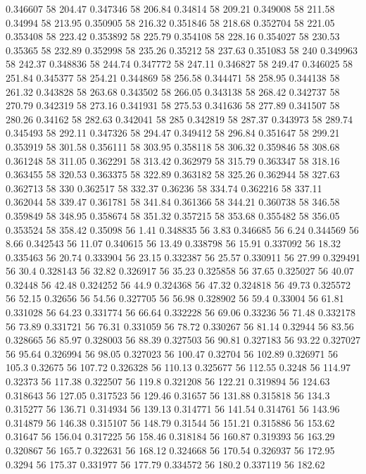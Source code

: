 0.346607 58 204.47
0.347346 58 206.84
0.34814 58 209.21
0.349008 58 211.58
0.34994 58 213.95
0.350905 58 216.32
0.351846 58 218.68
0.352704 58 221.05
0.353408 58 223.42
0.353892 58 225.79
0.354108 58 228.16
0.354027 58 230.53
0.35365 58 232.89
0.352998 58 235.26
0.35212 58 237.63
0.351083 58 240
0.349963 58 242.37
0.348836 58 244.74
0.347772 58 247.11
0.346827 58 249.47
0.346025 58 251.84
0.345377 58 254.21
0.344869 58 256.58
0.344471 58 258.95
0.344138 58 261.32
0.343828 58 263.68
0.343502 58 266.05
0.343138 58 268.42
0.342737 58 270.79
0.342319 58 273.16
0.341931 58 275.53
0.341636 58 277.89
0.341507 58 280.26
0.34162 58 282.63
0.342041 58 285
0.342819 58 287.37
0.343973 58 289.74
0.345493 58 292.11
0.347326 58 294.47
0.349412 58 296.84
0.351647 58 299.21
0.353919 58 301.58
0.356111 58 303.95
0.358118 58 306.32
0.359846 58 308.68
0.361248 58 311.05
0.362291 58 313.42
0.362979 58 315.79
0.363347 58 318.16
0.363455 58 320.53
0.363375 58 322.89
0.363182 58 325.26
0.362944 58 327.63
0.362713 58 330
0.362517 58 332.37
0.36236 58 334.74
0.362216 58 337.11
0.362044 58 339.47
0.361781 58 341.84
0.361366 58 344.21
0.360738 58 346.58
0.359849 58 348.95
0.358674 58 351.32
0.357215 58 353.68
0.355482 58 356.05
0.353524 58 358.42
0.35098 56 1.41
0.348835 56 3.83
0.346685 56 6.24
0.344569 56 8.66
0.342543 56 11.07
0.340615 56 13.49
0.338798 56 15.91
0.337092 56 18.32
0.335463 56 20.74
0.333904 56 23.15
0.332387 56 25.57
0.330911 56 27.99
0.329491 56 30.4
0.328143 56 32.82
0.326917 56 35.23
0.325858 56 37.65
0.325027 56 40.07
0.32448 56 42.48
0.324252 56 44.9
0.324368 56 47.32
0.324818 56 49.73
0.325572 56 52.15
0.32656 56 54.56
0.327705 56 56.98
0.328902 56 59.4
0.33004 56 61.81
0.331028 56 64.23
0.331774 56 66.64
0.332228 56 69.06
0.33236 56 71.48
0.332178 56 73.89
0.331721 56 76.31
0.331059 56 78.72
0.330267 56 81.14
0.32944 56 83.56
0.328665 56 85.97
0.328003 56 88.39
0.327503 56 90.81
0.327183 56 93.22
0.327027 56 95.64
0.326994 56 98.05
0.327023 56 100.47
0.32704 56 102.89
0.326971 56 105.3
0.32675 56 107.72
0.326328 56 110.13
0.325677 56 112.55
0.3248 56 114.97
0.32373 56 117.38
0.322507 56 119.8
0.321208 56 122.21
0.319894 56 124.63
0.318643 56 127.05
0.317523 56 129.46
0.31657 56 131.88
0.315818 56 134.3
0.315277 56 136.71
0.314934 56 139.13
0.314771 56 141.54
0.314761 56 143.96
0.314879 56 146.38
0.315107 56 148.79
0.31544 56 151.21
0.315886 56 153.62
0.31647 56 156.04
0.317225 56 158.46
0.318184 56 160.87
0.319393 56 163.29
0.320867 56 165.7
0.322631 56 168.12
0.324668 56 170.54
0.326937 56 172.95
0.3294 56 175.37
0.331977 56 177.79
0.334572 56 180.2
0.337119 56 182.62
